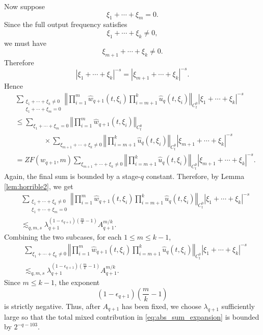 \documentclass[12pt,reqno,letterpaper]{amsart}
\numberwithin{equation}{section}
\newcommand{\1}{{\bf 1}}
\newcommand{\2}{{\bf 2}}
\theoremstyle{remark}
\theoremstyle{remark}
\begin{document}
Now suppose
\[
    \xi_1+\cdots+\xi_m=0.
\]
Since the full output frequency satisfies
\[
    \xi_1+\cdots+\xi_k\neq0,
\]
we must have
\[
    \xi_{m+1}+\cdots+\xi_k\neq0.
\]
Therefore
\[
    |\xi_1+\cdots+\xi_k|^{-s}
    =
    |\xi_{m+1}+\cdots+\xi_k|^{-s}.
\]
Hence
\[
\begin{aligned}
&\sum_{\substack{\xi_1+\cdots+\xi_k\neq0\\ \xi_1+\cdots+\xi_m=0}}
\left\Vert
\prod_{i=1}^m \hat{w}_{q+1}(t,\xi_i)
\prod_{i=m+1}^k \hat{u}_q(t,\xi_i)
\right\Vert_{C_t^0}
|\xi_1+\cdots+\xi_k|^{-s}
\\
&\leq
\sum_{\xi_1+\cdots+\xi_m=0}
\left\Vert
\prod_{i=1}^m \hat{w}_{q+1}(t,\xi_i)
\right\Vert_{C_t^0}
\\
&\qquad\qquad\times
\sum_{\xi_{m+1}+\cdots+\xi_k\neq0}
\left\Vert
\prod_{i=m+1}^k \hat{u}_q(t,\xi_i)
\right\Vert_{C_t^0}
|\xi_{m+1}+\cdots+\xi_k|^{-s}
\\
&=
ZF(w_{q+1},m)
\sum_{\xi_{m+1}+\cdots+\xi_k\neq0}
\left\Vert
\prod_{i=m+1}^k \hat{u}_q(t,\xi_i)
\right\Vert_{C_t^0}
|\xi_{m+1}+\cdots+\xi_k|^{-s}.
\end{aligned}
\]
Again, the final sum is bounded by a stage-$q$ constant. Therefore, by Lemma \ref{lem:horrible2}, we get
\[
\begin{aligned}
&\sum_{\substack{\xi_1+\cdots+\xi_k\neq0\\ \xi_1+\cdots+\xi_m=0}}
\left\Vert
\prod_{i=1}^m \hat{w}_{q+1}(t,\xi_i)
\prod_{i=m+1}^k \hat{u}_q(t,\xi_i)
\right\Vert_{C_t^0}
|\xi_1+\cdots+\xi_k|^{-s}
\\
&\lesssim_{q,m,s}
\lambda_{q+1}^{(1-\epsilon_{q+1})(\frac mk-1)}
A_{q+1}^{m/k}.
\end{aligned}
\]
Combining the two subcases, for each $1\leq m\leq k-1$,
\begin{equation}\label{eq:mixed-prod-bound}
\begin{aligned}
&\sum_{\xi_1+\cdots+\xi_k\neq0}
\left\Vert
\prod_{i=1}^m \hat{w}_{q+1}(t,\xi_i)
\prod_{i=m+1}^k \hat{u}_q(t,\xi_i)
\right\Vert_{C_t^0}
|\xi_1+\cdots+\xi_k|^{-s}
\\
&\lesssim_{q,m,s}
\lambda_{q+1}^{(1-\epsilon_{q+1})(\frac mk-1)}
A_{q+1}^{m/k}.
\end{aligned}
\end{equation}
Since $m\leq k-1$, the exponent
\[
    (1-\epsilon_{q+1})\left(\frac mk-1\right)
\]
is strictly negative. Thus, after $A_{q+1}$ has been fixed, we choose $\lambda_{q+1}$ sufficiently large so that the total mixed contribution in \eqref{eq:abs_sum_expansion} is bounded by $2^{-q-103}$.
\end{document}
